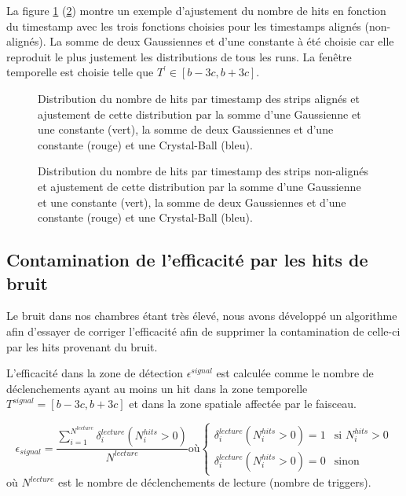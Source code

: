 La figure \ref{align} (\ref{nonalign}) montre un exemple d'ajustement du nombre de hits en fonction du timestamp avec les trois fonctions choisies pour les timestamps alignés (non-alignés). La somme de deux Gaussiennes et d'une constante à été choisie car elle reproduit le plus justement les distributions de tous les runs. La fenêtre temporelle est choisie telle que $T^{'}\in \left[b-3c,b+3c\right]$.

\begin{figure}[ht!]
	\centering
	\caption{Distribution du nombre de hits par timestamp des strips alignés et ajustement de cette distribution par la somme d'une Gaussienne et une constante (vert), la somme de deux Gaussiennes et d'une constante (rouge) et une Crystal-Ball (bleu).}
	\label{align}
\end{figure}

\begin{figure}[ht!]
	\centering
	\caption{Distribution du nombre de hits par timestamp des strips non-alignés et ajustement de cette distribution par la somme d'une Gaussienne et une constante (vert), la somme de deux Gaussiennes et d'une constante (rouge) et une Crystal-Ball (bleu).}
	\label{nonalign}
\end{figure}

\subsection{Contamination de l'efficacité par les hits de bruit}

Le bruit dans nos chambres étant très élevé, nous avons développé un algorithme afin d'essayer de corriger l'efficacité afin de supprimer la contamination de celle-ci par les hits provenant du bruit.

L'efficacité dans la zone de détection $\epsilon^{signal}$ est calculée comme le nombre de déclenchements ayant au moins un hit dans la zone temporelle $T^{signal}=\left[b-3c,b+3c\right]$ et dans la zone spatiale affectée par le faisceau.

\begin{equation}
\epsilon_{signal}=\frac{\sum\limits_{i=1}^{N^{lecture}} \delta^{lecture}_i(N^{hits}_{i}>0)}{N^{lecture}} \mbox{où}
\left\{
\begin{array}{ll}
\delta^{lecture}_i(N^{hits}_{i}>0)=1 & \mbox{si } N^{hits}_{i}>0 \\
\delta^{lecture}_i(N^{hits}_{i}>0)=0 & \mbox{sinon}
\end{array}
\right.
\end{equation}
où $N^{lecture}$ est le nombre de déclenchements de lecture (nombre de triggers).

